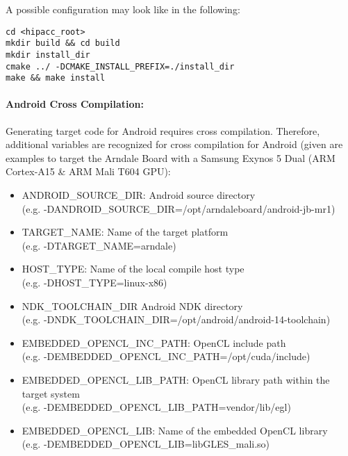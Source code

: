 A possible configuration may look like in the following:
\begin{lstlisting}
cd <hipacc_root>
mkdir build && cd build
mkdir install_dir
cmake ../ -DCMAKE_INSTALL_PREFIX=./install_dir
make && make install
\end{lstlisting}


\paragraph{Android Cross Compilation:}
Generating target code for Android requires cross compilation. Therefore,
additional variables are recognized for cross compilation for Android (given
are examples to target the Arndale Board with a Samsung Exynos 5 Dual (ARM
Cortex-A15 \& ARM Mali T604 GPU):

\begin{itemize}
    \item ANDROID\_SOURCE\_DIR:         Android source directory\\(e.g. -DANDROID\_SOURCE\_DIR=/opt/arndaleboard/android-jb-mr1)
    \item TARGET\_NAME:                 Name of the target platform\\(e.g. -DTARGET\_NAME=arndale)
    \item HOST\_TYPE:                   Name of the local compile host type\\(e.g. -DHOST\_TYPE=linux-x86)
    \item NDK\_TOOLCHAIN\_DIR           Android NDK directory\\(e.g. -DNDK\_TOOLCHAIN\_DIR=/opt/android/android-14-toolchain)
    \item EMBEDDED\_OPENCL\_INC\_PATH:  OpenCL include path\\(e.g. -DEMBEDDED\_OPENCL\_INC\_PATH=/opt/cuda/include)
    \item EMBEDDED\_OPENCL\_LIB\_PATH:  OpenCL library path within the target system\\(e.g. -DEMBEDDED\_OPENCL\_LIB\_PATH=vendor/lib/egl)
    \item EMBEDDED\_OPENCL\_LIB:        Name of the embedded OpenCL library\\(e.g. -DEMBEDDED\_OPENCL\_LIB=libGLES\_mali.so)
\end{itemize}


